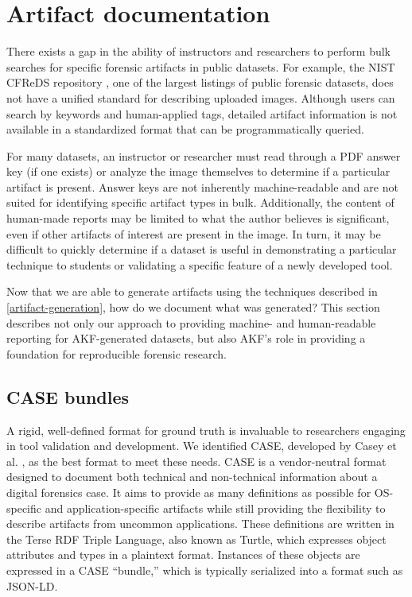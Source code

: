 \documentclass[final,5p,times,twocolumn]{elsarticle}
\begin{document}
\section{Artifact documentation}\label{artifact-documentation}

There exists a gap in the ability of instructors and researchers to
perform bulk searches for specific forensic artifacts in public
datasets. For example, the NIST CFReDS repository
\cite{nationalinstituteofstandardsandtechnologyCFReDSPortal}, one of
the largest listings of public forensic datasets, does not have a
unified standard for describing uploaded images. Although users can
search by keywords and human-applied tags, detailed artifact information
is not available in a standardized format that can be programmatically
queried.

For many datasets, an instructor or researcher must read through a PDF
answer key (if one exists) or analyze the image themselves to determine
if a particular artifact is present. Answer keys are not inherently
machine-readable and are not suited for identifying specific artifact
types in bulk. Additionally, the content of human-made reports may be
limited to what the author believes is significant, even if other
artifacts of interest are present in the image. In turn, it may be
difficult to quickly determine if a dataset is useful in demonstrating a
particular technique to students or validating a specific feature of a
newly developed tool.

Now that we are able to generate artifacts using the techniques
described in \autoref{artifact-generation}, how do we document what was
generated? This section describes not only our approach to providing
machine- and human-readable reporting for AKF-generated datasets, but
also AKF's role in providing a foundation for reproducible forensic
research.

\subsection{CASE bundles}\label{case-bundles}

A rigid, well-defined format for ground truth is invaluable to
researchers engaging in tool validation and development. We identified
CASE, developed by Casey et al.
\cite{caseyAdvancingCoordinatedCyberinvestigations2017}, as the best
format to meet these needs. CASE is a vendor-neutral format designed to
document both technical and non-technical information about a digital
forensics case. It aims to provide as many definitions as possible for
OS-specific and application-specific artifacts while still providing the
flexibility to describe artifacts from uncommon applications. These
definitions are written in the Terse RDF Triple Language, also known as
Turtle, which expresses object attributes and types in a plaintext
format. Instances of these objects are expressed in a CASE ``bundle,''
which is typically serialized into a format such as JSON-LD.
\end{document}
